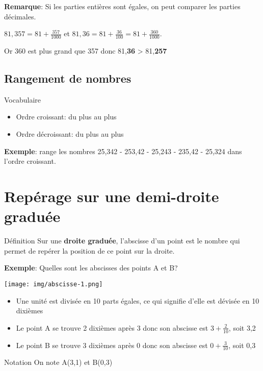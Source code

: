 \documentclass[12pt,a4paper]{article}
\begin{document}
\textbf{Remarque}: Si les parties entières  sont égales, on peut comparer les parties décimales.

$\displaystyle 81,357 = 81+\frac{357}{1000}$ et $\displaystyle 81,36 = 81+\frac{36}{100} = 81+\frac{360}{1000}$.

Or 360  est plus grand que 357  donc 81,\textbf{36} > 81,\textbf{257}
 
\subsection{Rangement de nombres}

\begin{definition}{Vocabulaire}
\begin{itemize}
\item Ordre croissant: du plus  au plus 
\item Ordre décroissant: du plus  au plus 
\end{itemize}
\end{definition}

\textbf{Exemple}: range les nombres 25,342 - 253,42 - 25,243 - 235,42 - 25,324 dans l'ordre croissant.


\section{Repérage sur une demi-droite graduée}

\begin{definition}{Définition}
Sur une \textbf{droite graduée}, l'abscisse d'un point est le nombre qui permet de repérer la position de ce point sur la droite.
\end{definition}

\textbf{Exemple}: Quelles sont les abscisses des points A et B?

\texttt{[image: img/abscisse-1.png]} 

\begin{itemize}
\item Une unité est divisée en 10 parts égales, ce qui signifie d'elle est dévisée en 10 dixièmes
\item Le point A se trouve 2 dixièmes après 3 donc son abscisse est $3+\frac{2}{10}$, soit 3,2
\item Le point B se trouve 3 dixièmes après 0 donc son abscisse est $0+\frac{3}{10}$, soit 0,3
\end{itemize}

\begin{definition}{Notation}
On note A(3,1) et B(0,3)
\end{definition}
\end{document}
